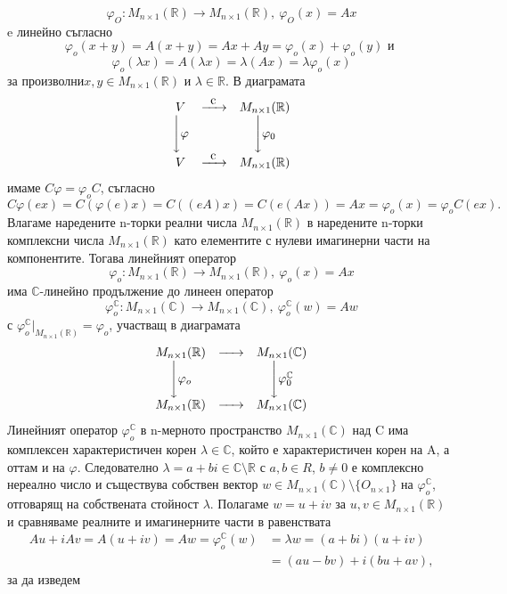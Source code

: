 \documentclass{article}
\begin{document}
\[
    \varphi_O : M_{n\times 1}(\mathbb{R}) \rightarrow M_{n\times 1}(\mathbb{R}), \ \varphi_O(x)=Ax
\]
e линейно съгласно
\[
    \varphi_o(x + y) = A(x + y) = Ax + Ay = \varphi_o(x) + \varphi_o(y) \text{ и }
\]
\[
    \varphi_o(\lambda x) = A(\lambda x) = \lambda(A x) = \lambda\varphi_o(x)
\]
за произволни$ x, y \in M_{n\times 1}(\mathbb{R})$ и $\lambda \in \mathbb{R}$. В диаграмата
\[
    \begin{array}{ccc}
        V                        & \xrightarrow{\makebox[0.5cm]{c}} & M_{n\times 1}(\mathbb{R})  \\
        \Bigg\downarrow{\varphi} &                                  & \Bigg\downarrow{\varphi_0} \\
        V                        & \xrightarrow{\makebox[0.5cm]{c}} & M_{n\times 1}(\mathbb{R})  \\
    \end{array}
\]
имаме $C\varphi = \varphi_oC$, съгласно
\[
    C\varphi(ex) = C(\varphi(e)x) = C((eA)x) = C(e(Ax)) = Ax = \varphi_o(x) = \varphi_oC(ex).
\]
Влагаме наредените n-торки реални числа $M_{n\times 1}(\mathbb{R})$ в наредените n-торки комплексни числа
$M_{n\times 1}(\mathbb{R})$  като елементите с нулеви имагинерни части на компонентите. Тогава линейният
оператор
\[
    \varphi_o : M_{n\times 1}(\mathbb{R}) \rightarrow M_{n\times 1}(\mathbb{R}), \ \varphi_o(x)=Ax
\]
има $\mathbb{C}$-линейно продължение до линеен оператор
\[
    \varphi_o^\mathbb{C} : M_{n\times 1}(\mathbb{C}) \rightarrow M_{n\times 1}(\mathbb{C}), \ \varphi_o^\mathbb{C}(w)=Aw
\]
с $\varphi_o^\mathbb{C} |_{M_{n\times 1}(\mathbb{R})}=\varphi_o$, участващ в диаграмата
\[
    \begin{array}{ccc}
        M_{n\times 1}(\mathbb{R})  & \xrightarrow{\makebox[0.5cm]{}} & M_{n\times 1}(\mathbb{C})             \\
        \Bigg\downarrow{\varphi_o} &                                 & \Bigg\downarrow{\varphi_0^\mathbb{C}} \\
        M_{n\times 1}(\mathbb{R})  & \xrightarrow{\makebox[0.5cm]{}} & M_{n\times 1}(\mathbb{C})             \\
    \end{array}
\]
Линейният оператор $\varphi_o^\mathbb{C}$ в n-мерното пространство $M_{n\times 1}(\mathbb{C})$
над C има комплексен характеристичен корен $\lambda \in \mathbb{C}$, който е характеристичен
корен на A, а оттам и на $\varphi$. Следователно $\lambda = a + bi \in \mathbb{C} \setminus
    \mathbb{R}$ с $a, b \in R$, $b \neq 0$ е комплексно нереално число и съществува собствен
вектор $w \in M_{n\times 1}(\mathbb{C}) \setminus \{O_{n\times 1}\}$ на $\varphi_o^\mathbb{C}$,
отговарящ на собствената стойност $\lambda$. Полагаме $w = u + iv$ за $u,v \in M_{n\times 1}(\mathbb{R})$
и сравняваме реалните и имагинерните части в равенствата
\begin{align*}
    Au+iAv = A(u+iv) = Aw = \varphi_o^\mathbb{C}(w) & = \lambda w = (a+bi)(u+iv) \\
                                                    & = (au-bv)+i(bu+av),
\end{align*}
за да изведем
\end{document}
